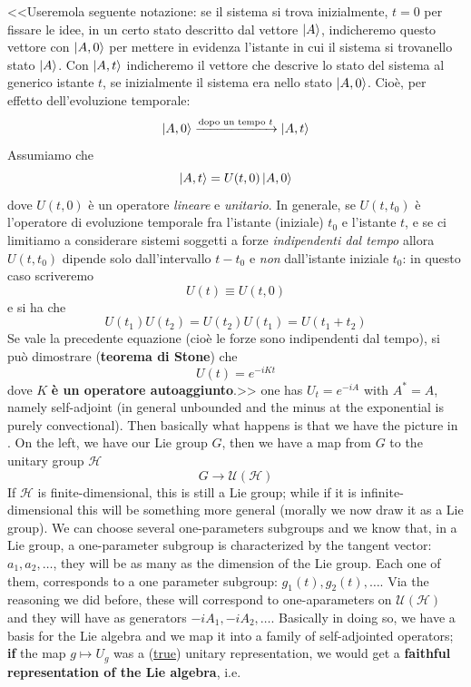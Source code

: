 \documentclass[../main.tex]{subfiles}
\begin{document}
\begin{enumerate}
{    <<Useremola seguente notazione: se il sistema si trova inizialmente, $t = 0$ per fissare le idee, in un certo stato descritto dal vettore $\ket{A}$, indicheremo questo vettore con $\ket{A,0}$ per mettere in evidenza l’istante in cui il sistema si trovanello stato $\ket{A}$. Con $\ket{A,t}$ indicheremo il vettore che descrive lo stato del sistema al generico istante $t$, se inizialmente il sistema era nello stato $\ket{A,0}$. Cioè, per effetto dell'evoluzione temporale: \[ \ket{A,0}\xrightarrow[]{\textrm{dopo un tempo $t$}}\ket{A,t} 
    \] 
    Assumiamo che 
    \[
    \ket{A,t}=U(t,0)\ket{A,0}
    \]
    dove $U(t,0)$ è un operatore \textit{lineare} e \textit{unitario}. In generale, se $U(t, t_0)$ è l'operatore di evoluzione temporale fra l’istante (iniziale) $t_0$ e l'istante $t$, e se ci limitiamo a considerare sistemi soggetti a forze \textit{indipendenti dal tempo} allora $U(t, t_0)$ dipende solo dall’intervallo $t-t_0$ e \textit{non} dall’istante iniziale $t_0$: in questo caso scriveremo
    \[
    U(t)\equiv U(t,0)
    \]
    e si ha che
    \[
    U(t_1)U(t_2)=U(t_2)U(t_1)=U(t_1+t_2)
    \]
    Se vale la precedente equazione (cioè le forze sono indipendenti dal tempo), si può dimostrare (\textbf{teorema di Stone}) che
    \[
    U(t)=e^{-iKt}
    \]
    dove $K$ \textbf{è un operatore autoaggiunto}.>>} one has $U_t=e^{-iA}$ with $A^\ast=A$, namely self-adjoint (in general unbounded and the minus at the exponential is purely convectional). 
    Then basically what happens is that we have the picture in . On the left, we have our Lie group $G$, then we have a map from $G$ to the unitary group $\mathcal{H}$
    \[
    G\to\mathcal{U}(\mathcal{H})
    \]
    If $\mathcal{H}$ is finite-dimensional, this is still a Lie group; while if it is infinite-dimensional this will be something more general (morally we now draw it as a Lie group). We can choose several one-parameters subgroups and we know that, in a Lie group, a one-parameter subgroup is  characterized by the tangent vector: $a_1, a_2, \dots$, they will be as many as the dimension of the Lie group. Each one of them, corresponds to a one parameter subgroup: $g_1(t), g_2(t),\dots$. Via the reasoning we did before, these will correspond to one-aparameters on $\mathcal{U}(\mathcal{H})$ and they will have as generators $-iA_1,-iA_2,\dots$. Basically in doing so, we have a basis for the Lie algebra and we map it into a family of self-adjointed operators; \textbf{if} the map $g\mapsto U_g$ was a (\underline{true}) unitary representation, we would get a \textbf{faithful representation of the Lie algebra}, i.e.

\end{enumerate}
\end{document}
